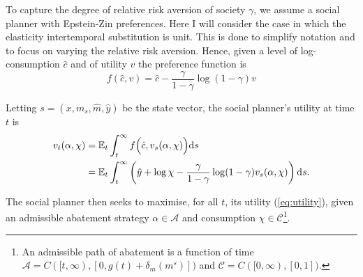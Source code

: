 \documentclass[../../main.tex]{subfiles}
\begin{document}
To capture the degree of relative risk aversion of society $\gamma$, we assume a social planner with Epstein-Zin preferences. Here I will consider the case in which the elasticity intertemporal substitution is unit. This is done to simplify notation and to focus on varying the relative risk aversion. Hence, given a level of log-consumption $\hat c$ and of utility $v$ the preference function is \begin{equation}
    f(\hat c, v) = \hat c - \frac{\gamma}{1 - \gamma} \log (1 - \gamma)v
\end{equation}

Letting $s = (x, m_s, \hat m, \hat y)$ be the state vector, the social planner's utility at time $t$ is \begin{equation} \label{eq:utility}
    \begin{split}
        v_t(\alpha, \chi) &= \mathbb{E}_t \int^{\infty}_t f\Big(\hat c, v_s(\alpha, \chi) \Big) \text{d} s \\
        &= \mathbb{E}_t \int^{\infty}_t \left( \hat y + \log \chi - \frac{\gamma}{1 - \gamma} \log (1 - \gamma) v_s(\alpha, \chi) \right) \text{d} s.
    \end{split}
\end{equation}

The social planner then seeks to maximise, for all $t$, its utility (\ref{eq:utility}), given an admissible abatement strategy $\alpha \in \mathcal{A}$ and consumption $\chi \in \mathcal{C}$\footnote{
    An admissible path of abatement is a function of time $\mathcal{A} = C([t, \infty), [0, g(t) + \delta_m(m^s)])$ and $\mathcal{C} = C([0, \infty), [0, 1])$.
}.
\end{document}
